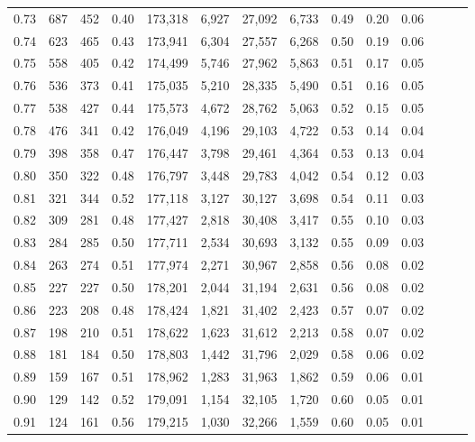 \begin{tabular}{rrrrrrrrrrrrrr}
0.73 &    687 &  452 &  0.40 &  173,318 &    6,927 &  27,092 &   6,733 &  0.49 &  0.20 &      0.06 \\
0.74 &    623 &  465 &  0.43 &  173,941 &    6,304 &  27,557 &   6,268 &  0.50 &  0.19 &      0.06 \\
0.75 &    558 &  405 &  0.42 &  174,499 &    5,746 &  27,962 &   5,863 &  0.51 &  0.17 &      0.05 \\
0.76 &    536 &  373 &  0.41 &  175,035 &    5,210 &  28,335 &   5,490 &  0.51 &  0.16 &      0.05 \\
0.77 &    538 &  427 &  0.44 &  175,573 &    4,672 &  28,762 &   5,063 &  0.52 &  0.15 &      0.05 \\
0.78 &    476 &  341 &  0.42 &  176,049 &    4,196 &  29,103 &   4,722 &  0.53 &  0.14 &      0.04 \\
0.79 &    398 &  358 &  0.47 &  176,447 &    3,798 &  29,461 &   4,364 &  0.53 &  0.13 &      0.04 \\
0.80 &    350 &  322 &  0.48 &  176,797 &    3,448 &  29,783 &   4,042 &  0.54 &  0.12 &      0.03 \\
0.81 &    321 &  344 &  0.52 &  177,118 &    3,127 &  30,127 &   3,698 &  0.54 &  0.11 &      0.03 \\
0.82 &    309 &  281 &  0.48 &  177,427 &    2,818 &  30,408 &   3,417 &  0.55 &  0.10 &      0.03 \\
0.83 &    284 &  285 &  0.50 &  177,711 &    2,534 &  30,693 &   3,132 &  0.55 &  0.09 &      0.03 \\
0.84 &    263 &  274 &  0.51 &  177,974 &    2,271 &  30,967 &   2,858 &  0.56 &  0.08 &      0.02 \\
0.85 &    227 &  227 &  0.50 &  178,201 &    2,044 &  31,194 &   2,631 &  0.56 &  0.08 &      0.02 \\
0.86 &    223 &  208 &  0.48 &  178,424 &    1,821 &  31,402 &   2,423 &  0.57 &  0.07 &      0.02 \\
0.87 &    198 &  210 &  0.51 &  178,622 &    1,623 &  31,612 &   2,213 &  0.58 &  0.07 &      0.02 \\
0.88 &    181 &  184 &  0.50 &  178,803 &    1,442 &  31,796 &   2,029 &  0.58 &  0.06 &      0.02 \\
0.89 &    159 &  167 &  0.51 &  178,962 &    1,283 &  31,963 &   1,862 &  0.59 &  0.06 &      0.01 \\
0.90 &    129 &  142 &  0.52 &  179,091 &    1,154 &  32,105 &   1,720 &  0.60 &  0.05 &      0.01 \\
0.91 &    124 &  161 &  0.56 &  179,215 &    1,030 &  32,266 &   1,559 &  0.60 &  0.05 &      0.01 \\

\end{tabular}
